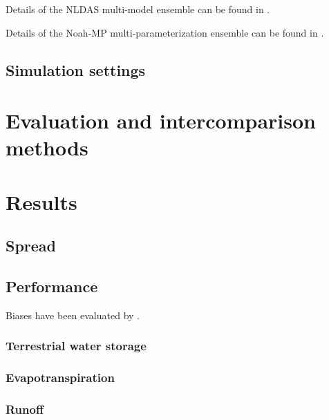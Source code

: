 \documentclass[essd]{copernicus}
\begin{document}
Details of the NLDAS multi-model ensemble can be found in \citet{xia2012JGRA,
xia2012JGRAa, fei2021WRR}.

Details of the Noah-MP multi-parameterization ensemble can be found in
\citet{zheng2019WRR, zheng2020JAMES, fei2021WRR}.


\subsection{Simulation settings}\label{sec:data:simulation}


\section{Evaluation and intercomparison methods}\label{sec:evaluation}


\section{Results} \label{sec:result}

\subsection{Spread}

\subsection{Performance}

Biases have been evaluated by \citet{zheng2020JAMES}.

\subsubsection{Terrestrial water storage}

\citep{landerer2012WRR}


\subsubsection{Evapotranspiration}

\subsubsection{Runoff}


 \label{sec:availability}
\end{document}

